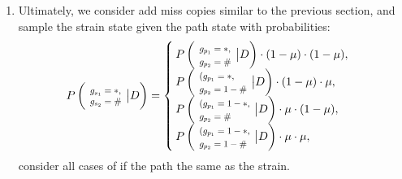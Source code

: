 \documentclass{bioinfo}
\newcommand*{\Scale}[2][4]{\scalebox{#1}{$#2$}}%
\begin{document}
\begin{enumerate}
\item
Ultimately, we consider add miss copies similar to the previous section, and sample the strain state given the path state with probabilities:
\begin{equation*}
P\left(\Scale[0.8]{ \begin{array}{l} g_{s_1} = *, \\g_{s_2} = \# \end{array}}\big{|} D\right) =
\begin{cases}
P\left(\Scale[0.8]{ \begin{array}{l} g_{p_1} = *, \\g_{p_2} = \# \end{array}} \big{|} D\right) \cdot (1-\mu) \cdot (1-\mu), \\%
P\left(\Scale[0.8]{ \begin{array}{l}(g_{p_1} = *, \\g_{p_2} = 1-\# \end{array}}\big{|} D\right) \cdot (1 - \mu) \cdot \mu, \\%
P\left(\Scale[0.8]{ \begin{array}{l}(g_{p_1} = 1-*, \\g_{p_2} = \# \end{array}}\big{|} D\right) \cdot \mu \cdot (1 - \mu), \\%
P\left(\Scale[0.8]{ \begin{array}{l}(g_{p_1} = 1-*, \\g_{p_2} = 1-\# \end{array}}\big{|} D\right) \cdot \mu \cdot \mu, \\%
\end{cases}
\end{equation*}
consider all cases of if the path the same as the strain.
\end{enumerate}
\end{document}
